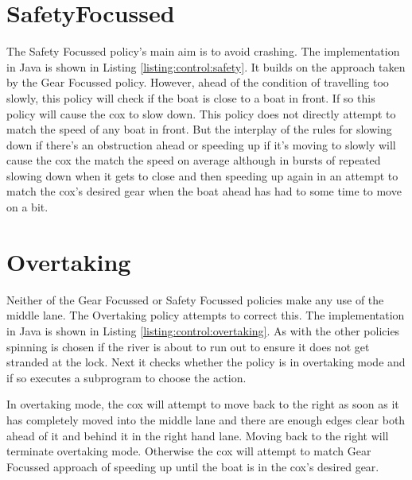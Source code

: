 

\section{SafetyFocussed}

The Safety Focussed policy's main aim is to avoid crashing. The implementation in Java is shown in Listing \ref{listing:control:safety}. It builds on the approach taken by the Gear Focussed policy. However, ahead of the condition of travelling too slowly, this policy will check if the boat is close to a boat in front. If so this policy will cause the cox to slow down. This policy does not directly attempt to match the speed of any boat in front. But the interplay of the rules for slowing down if there's an obstruction ahead or speeding up if it's moving to slowly will cause the cox the match the speed on average although in bursts of repeated slowing down when it gets to close and then speeding up again in an attempt to match the cox's desired gear when the boat ahead has had to some time to move on a bit.



\section{Overtaking}

Neither of the Gear Focussed or Safety Focussed policies make any use of the middle lane. The Overtaking policy  attempts to correct this. The implementation in Java is shown in Listing \ref{listing:control:overtaking}. As with the other policies spinning is chosen if the river is about to run out to ensure it does not get stranded at the lock. Next it checks whether the policy is in overtaking mode and if so executes a subprogram to choose the action.

In overtaking mode, the cox will attempt to move back to the right as soon as it has completely moved into the middle lane and there are enough edges clear both ahead of it and behind it in the right hand lane. Moving back to the right will terminate overtaking mode. Otherwise the cox will attempt to match Gear Focussed approach of speeding up until the boat is in the cox's desired gear.

